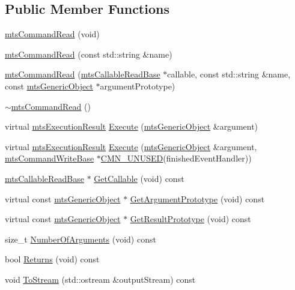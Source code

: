 \subsection*{Public Member Functions}
\begin{DoxyCompactItemize}
\item 
\hyperlink{classmts_command_read_ab7638c37f1324419aecfd630c1956242}{mts\-Command\-Read} (void)
\item 
\hyperlink{classmts_command_read_a3284698af9e589017a99d01c106d134f}{mts\-Command\-Read} (const std\-::string \&name)
\item 
\hyperlink{classmts_command_read_ad1fd48cbf7eef09ec6b6ac949cf07266}{mts\-Command\-Read} (\hyperlink{classmts_callable_read_base}{mts\-Callable\-Read\-Base} $\ast$callable, const std\-::string \&name, const \hyperlink{classmts_generic_object}{mts\-Generic\-Object} $\ast$argument\-Prototype)
\item 
\hyperlink{classmts_command_read_a0bec5b8aab94dc7bc4bd0334592b773a}{$\sim$mts\-Command\-Read} ()
\item 
virtual \hyperlink{classmts_execution_result}{mts\-Execution\-Result} \hyperlink{classmts_command_read_ac7186f6e12418c551c483105719a8a38}{Execute} (\hyperlink{classmts_generic_object}{mts\-Generic\-Object} \&argument)
\item 
virtual \hyperlink{classmts_execution_result}{mts\-Execution\-Result} \hyperlink{classmts_command_read_ae5df5d5a093d4c465b3a6d3092755305}{Execute} (\hyperlink{classmts_generic_object}{mts\-Generic\-Object} \&argument, \hyperlink{classmts_command_write_base}{mts\-Command\-Write\-Base} $\ast$\hyperlink{cmn_portability_8h_a021894e2626935fa2305434b1e893ff6}{C\-M\-N\-\_\-\-U\-N\-U\-S\-E\-D}(finished\-Event\-Handler))
\item 
\hyperlink{classmts_callable_read_base}{mts\-Callable\-Read\-Base} $\ast$ \hyperlink{classmts_command_read_a0787cf1a8fa82d5bef0e904fce8a1b94}{Get\-Callable} (void) const 
\item 
virtual const \hyperlink{classmts_generic_object}{mts\-Generic\-Object} $\ast$ \hyperlink{classmts_command_read_af68b3e7a6e6a32759affbbd6a6715a72}{Get\-Argument\-Prototype} (void) const 
\item 
virtual const \hyperlink{classmts_generic_object}{mts\-Generic\-Object} $\ast$ \hyperlink{classmts_command_read_a799a502c2c5bfa07a1eb65bd69c72ed7}{Get\-Result\-Prototype} (void) const 
\item 
size\-\_\-t \hyperlink{classmts_command_read_ae3cd3d0b3aded18cc412ba2727ba1d65}{Number\-Of\-Arguments} (void) const 
\item 
bool \hyperlink{classmts_command_read_a375ea296870810376b01474297efff64}{Returns} (void) const 
\item 
void \hyperlink{classmts_command_read_a7790e415f816894d2a97ba1358848f19}{To\-Stream} (std\-::ostream \&output\-Stream) const 
\end{DoxyCompactItemize}
